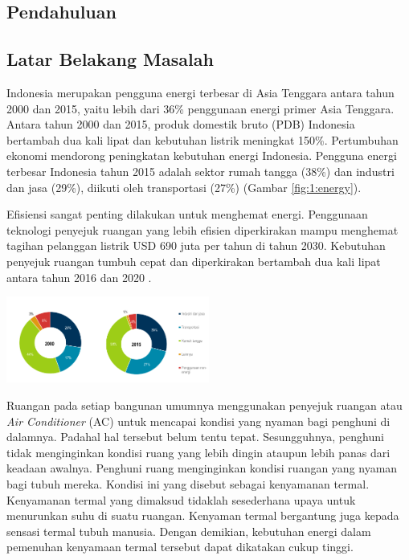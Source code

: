 \documentclass[a4paper,10pt]{article}
\makeatletter
\newenvironment{body}{\begin{multicols}{2}}{\end{multicols}}
\renewenvironment{figure}
{\def\@captype{figure}%
	\captionsetup{labelsep=period,format=hang,font=footnotesize,justification=justified}
}
{}
\makeatother
\begin{document}
	\begin{body}
		\section{Pendahuluan}
		\subsection{Latar Belakang Masalah}
		Indonesia merupakan pengguna energi terbesar di Asia Tenggara antara tahun 2000 dan 2015, yaitu lebih dari 36\% penggunaan energi primer Asia Tenggara. Antara tahun 2000 dan 2015, produk domestik bruto (PDB) Indonesia bertambah dua kali lipat dan kebutuhan listrik meningkat 150\%. Pertumbuhan ekonomi mendorong peningkatan kebutuhan energi Indonesia. Pengguna energi terbesar Indonesia tahun 2015 adalah sektor rumah tangga (38\%) dan industri dan jasa (29\%), diikuti oleh transportasi (27\%) (Gambar \ref{fig:1:energy}).
		
		Efisiensi sangat penting dilakukan untuk menghemat energi. Penggunaan teknologi penyejuk ruangan yang lebih efisien diperkirakan mampu
		menghemat tagihan pelanggan listrik USD 690 juta per tahun di tahun 2030. Kebutuhan
		penyejuk ruangan tumbuh cepat dan diperkirakan bertambah dua kali lipat antara tahun
		2016 dan 2020 \cite{IEA}.
		
		\begin{figure}
			\centering
			\includegraphics[width=0.5\textwidth]{figures/EnergyUsage}
			\caption{Penggunaan energi final per sektor di Indonesia, 2000 dan 2015 \cite{IEA}}
			\label{fig:1:energy}
		\end{figure}
		
		
		Ruangan pada setiap bangunan umumnya menggunakan penyejuk ruangan atau \textit{Air Conditioner} (AC) untuk mencapai kondisi yang nyaman bagi penghuni di dalamnya. Padahal hal tersebut belum tentu tepat. Sesungguhnya, penghuni tidak menginginkan kondisi ruang yang lebih dingin ataupun lebih panas dari keadaan awalnya. Penghuni ruang menginginkan kondisi ruangan yang nyaman bagi tubuh mereka. Kondisi ini yang disebut sebagai kenyamanan termal. Kenyamanan termal yang dimaksud tidaklah sesederhana upaya untuk menurunkan suhu di suatu ruangan. Kenyaman termal bergantung juga kepada sensasi termal tubuh manusia. Dengan demikian, kebutuhan energi dalam pemenuhan kenyamaan termal tersebut dapat dikatakan cukup tinggi.
		

\end{body}
\end{document}
